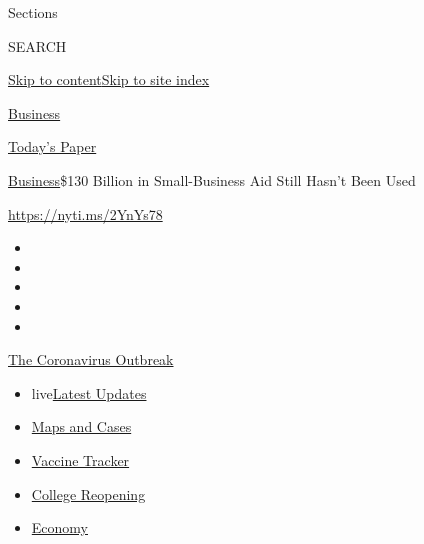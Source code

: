 Sections

SEARCH

\protect\hyperlink{site-content}{Skip to
content}\protect\hyperlink{site-index}{Skip to site index}

\href{https://www.nytimes3xbfgragh.onion/section/business}{Business}

\href{https://myaccount.nytimes3xbfgragh.onion/auth/login?response_type=cookie\&client_id=vi}{}

\href{https://www.nytimes3xbfgragh.onion/section/todayspaper}{Today's
Paper}

\href{/section/business}{Business}\textbar{}\$130 Billion in
Small-Business Aid Still Hasn't Been Used

\url{https://nyti.ms/2YnYs78}

\begin{itemize}
\item
\item
\item
\item
\item
\end{itemize}

\href{https://www.nytimes3xbfgragh.onion/news-event/coronavirus?action=click\&pgtype=Article\&state=default\&region=TOP_BANNER\&context=storylines_menu}{The
Coronavirus Outbreak}

\begin{itemize}
\tightlist
\item
  live\href{https://www.nytimes3xbfgragh.onion/2020/08/04/world/coronavirus-cases.html?action=click\&pgtype=Article\&state=default\&region=TOP_BANNER\&context=storylines_menu}{Latest
  Updates}
\item
  \href{https://www.nytimes3xbfgragh.onion/interactive/2020/us/coronavirus-us-cases.html?action=click\&pgtype=Article\&state=default\&region=TOP_BANNER\&context=storylines_menu}{Maps
  and Cases}
\item
  \href{https://www.nytimes3xbfgragh.onion/interactive/2020/science/coronavirus-vaccine-tracker.html?action=click\&pgtype=Article\&state=default\&region=TOP_BANNER\&context=storylines_menu}{Vaccine
  Tracker}
\item
  \href{https://www.nytimes3xbfgragh.onion/2020/08/02/us/covid-college-reopening.html?action=click\&pgtype=Article\&state=default\&region=TOP_BANNER\&context=storylines_menu}{College
  Reopening}
\item
  \href{https://www.nytimes3xbfgragh.onion/live/2020/08/04/business/stock-market-today-coronavirus?action=click\&pgtype=Article\&state=default\&region=TOP_BANNER\&context=storylines_menu}{Economy}
\end{itemize}

